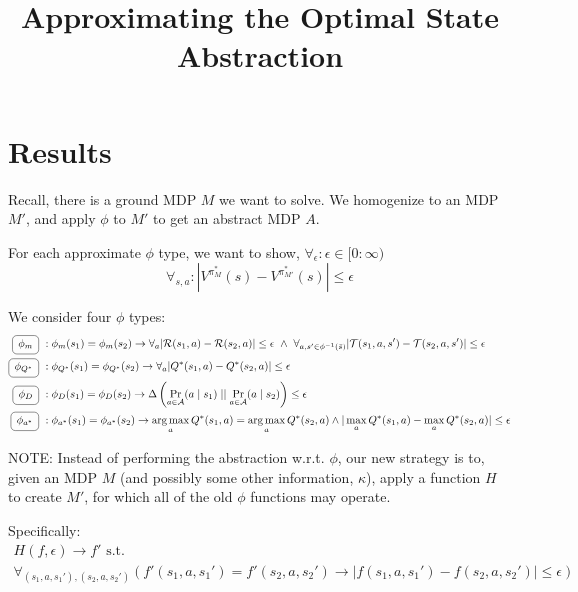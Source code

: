 \documentclass[11pt]{amsart}
\title{Approximating the Optimal State Abstraction}
\author{}
\date{}                                           %
\begin{document}
\maketitle
\section{Results}

Recall, there is a ground MDP $M$ we want to solve. We homogenize to an MDP $M'$, and apply $\phi$ to $M'$ to get an abstract MDP $A$.

For each approximate $\phi$ type, we want to show, $\forall_{\epsilon} : \epsilon \in [0 : \infty)$
\begin{equation}
\forall_{s,a} : | V^{\pi^*_M}(s) - V^{\pi^*_{M'}}(s) | \leq \epsilon
\end{equation}

We consider four $\phi$ types:
\begin{align*}
\encircle{\text{ $\phi_m$ }}\ & : \phi_{m}(s_1) = \phi_m(s_2) \rightarrow \forall_a |\mathcal{R}(s_1,a) - \mathcal{R}(s_2,a)| \leq \epsilon \ \wedge\ 
\forall_{a,s' \in \phi^{-1}(\bar{s})} | \mathcal{T}(s_1,a,s') - \mathcal{T}(s_2,a,s') | \leq \epsilon \\
\encircle{\text{ $\phi_{Q^*}$ }}\ & : \phi_{Q^*}(s_1) = \phi_{Q^*}(s_2) \rightarrow \forall_a |Q^*(s_1,a) - Q^*(s_2,a)| \leq \epsilon \\
\encircle{\text{ $\phi_{D}$ }}\ & : \phi_D(s_1) = \phi_D(s_2) \rightarrow \Delta \left( \Pr_{a \in \mathcal{A}}(a \mid s_1) \mid\mid \Pr_{a \in \mathcal{A}}(a \mid s_2) \right) \leq \epsilon \\
\encircle{\text{ $\phi_{a^*}$ }}\ & : \phi_{a^*}(s_1) = \phi_{a^*}(s_2) \rightarrow \argmax_a Q^*(s_1,a) = \argmax_a Q^*(s_2, a) \wedge |\max_a Q^*(s_1,a) - \max_a Q^*(s_2,a)| \leq \epsilon  \\
\end{align*}

NOTE: Instead of performing the abstraction w.r.t. $\phi$, our new strategy is to, given an MDP $M$ (and possibly some other information, $\kappa$), apply a function $H$ to create $M'$, for which all of the old $\phi$ functions may operate.

Specifically:
\begin{multline}
H(f, \epsilon) \rightarrow f' \text{  s.t.  } \\ \forall_{(s_1,a,s_1'),(s_2,a,s_2')} \left(f'(s_1,a,s_1') = f'(s_2,a,s_2') \rightarrow | f(s_1,a,s_1') - f(s_2,a,s_2') | \leq \epsilon\right)
\end{multline}
\end{document}

